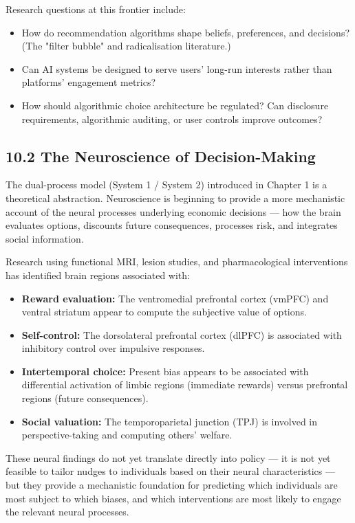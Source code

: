 \documentclass[12pt, letterpaper]{article}
\begin{document}
Research questions at this frontier include:
\begin{itemize}
\item How do recommendation algorithms shape beliefs, preferences, and decisions? (The "filter bubble" and radicalisation literature.)
\item Can AI systems be designed to serve users' long-run interests rather than platforms' engagement metrics?
\item How should algorithmic choice architecture be regulated? Can disclosure requirements, algorithmic auditing, or user controls improve outcomes?
\end{itemize}


\subsection{10.2 The Neuroscience of Decision-Making}


The dual-process model (System 1 / System 2) introduced in Chapter 1 is a theoretical abstraction. Neuroscience is beginning to provide a more mechanistic account of the neural processes underlying economic decisions --- how the brain evaluates options, discounts future consequences, processes risk, and integrates social information.

Research using functional MRI, lesion studies, and pharmacological interventions has identified brain regions associated with:
\begin{itemize}
\item \textbf{Reward evaluation:} The ventromedial prefrontal cortex (vmPFC) and ventral striatum appear to compute the subjective value of options.
\item \textbf{Self-control:} The dorsolateral prefrontal cortex (dlPFC) is associated with inhibitory control over impulsive responses.
\item \textbf{Intertemporal choice:} Present bias appears to be associated with differential activation of limbic regions (immediate rewards) versus prefrontal regions (future consequences).
\item \textbf{Social valuation:} The temporoparietal junction (TPJ) is involved in perspective-taking and computing others' welfare.
\end{itemize}

These neural findings do not yet translate directly into policy --- it is not yet feasible to tailor nudges to individuals based on their neural characteristics --- but they provide a mechanistic foundation for predicting which individuals are most subject to which biases, and which interventions are most likely to engage the relevant neural processes.
\end{document}
